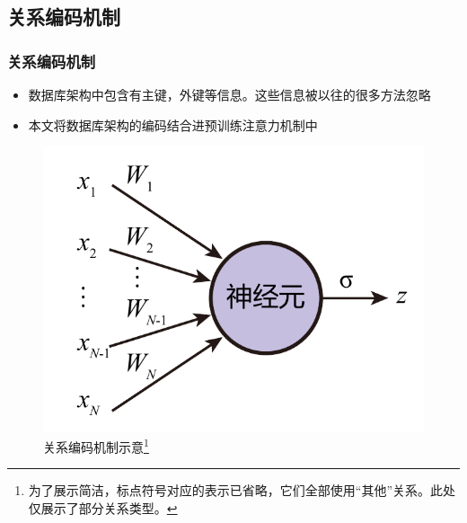 \documentclass{ctexbeamer}
\begin{document}
\subsection{关系编码机制}
\begin{frame}
  \frametitle{关系编码机制}
  \begin{itemize}
    \item 数据库架构中包含有主键，外键等信息。这些信息被以往的很多方法忽略
    \item 本文将数据库架构的编码结合进预训练注意力机制中
  \end{itemize}

  \begin{figure}
    \includegraphics[page=10,width=\textwidth]{figure/figures.pdf}
    \caption{关系编码机制示意\footnote{为了展示简洁，标点符号对应的表示已省略，它们全部使用“其他”关系。此处仅展示了部分关系类型。}}
  \end{figure}
\end{frame}
\end{document}
